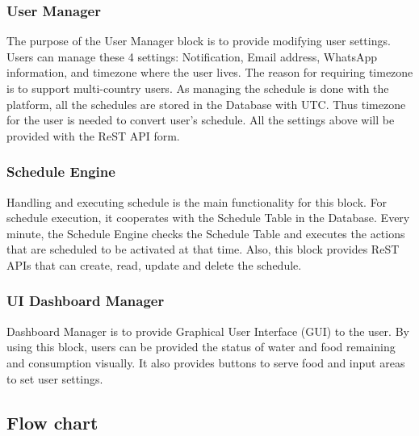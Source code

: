 \documentclass[conference]{IEEEtran}
\begin{document}
\subsubsection{User Manager}
\hfill \break The purpose of the User Manager block is to provide modifying user settings. Users can manage these 4 settings: Notification, Email address, WhatsApp information, and timezone where the user lives. The reason for requiring timezone is to support multi-country users. As managing the schedule is done with the platform, all the schedules are stored in the Database with UTC. Thus timezone for the user is needed to convert user’s schedule. All the settings above will be provided with the ReST API form.

\subsubsection{Schedule Engine}
\hfill \break Handling and executing schedule is the main functionality for this block. For schedule execution, it cooperates with the Schedule Table in the Database. Every minute, the Schedule Engine checks the Schedule Table and executes the actions that are scheduled to be activated at that time. Also, this block provides ReST APIs that can create, read, update and delete the schedule.

\subsubsection{UI Dashboard Manager}
\hfill \break Dashboard Manager is to provide Graphical User Interface (GUI) to the user. By using this block, users can be provided the status of water and food remaining and consumption visually. It also provides buttons to serve food and input areas to set user settings.


\subsection{Flow chart}
\end{document}
